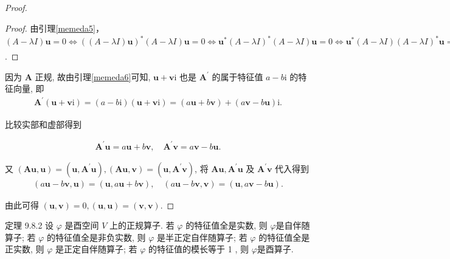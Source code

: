\begin{proof}
\begin{proof}
        由引理\cref{memeda5}，$(A-\lambda I)\boldsymbol{u}=0\Leftrightarrow ((A-\lambda I)\boldsymbol{u})^*(A-\lambda I)\boldsymbol{u}=0\Leftrightarrow \boldsymbol{u}^*(A-\lambda I)^*(A-\lambda I)\boldsymbol{u}=0\Leftrightarrow \boldsymbol{u}^*(A-\lambda I)(A-\lambda I)^*\boldsymbol{u}=0\Leftrightarrow (A^*-\overline{\lambda}I)\boldsymbol{u}=(A-\lambda I)^*\boldsymbol{u}=0$.
    \end{proof}

    因为 $\boldsymbol{A}$ 正规, 故由引理\cref{memeda6}可知, $\boldsymbol{u}+\boldsymbol{v} \mathrm{i}$ 也是 $\boldsymbol{A}^{\prime}$ 的属于特征值 $a-b \mathrm{i}$ 的特征向量, 即
    \begin{align*}
        \boldsymbol{A}^{\prime}(\boldsymbol{u}+\boldsymbol{v} \mathrm{i})=(a-b \mathrm{i})(\boldsymbol{u}+\boldsymbol{v} \mathrm{i})=(a \boldsymbol{u}+b \boldsymbol{v})+(a \boldsymbol{v}-b \boldsymbol{u}) \mathrm{i} .
    \end{align*}

    比较实部和虚部得到

    \begin{align}\label{memeda7}
        \boldsymbol{A}^{\prime} \boldsymbol{u}=a \boldsymbol{u}+b \boldsymbol{v}, \quad \boldsymbol{A}^{\prime} \boldsymbol{v}=a \boldsymbol{v}-b \boldsymbol{u} .
    \end{align}

    又 $(\boldsymbol{A} \boldsymbol{u}, \boldsymbol{u})=\left(\boldsymbol{u}, \boldsymbol{A}^{\prime} \boldsymbol{u}\right),(\boldsymbol{A} \boldsymbol{u}, \boldsymbol{v})=\left(\boldsymbol{u}, \boldsymbol{A}^{\prime} \boldsymbol{v}\right)$, 将 $\boldsymbol{A} \boldsymbol{u}, \boldsymbol{A}^{\prime} \boldsymbol{u}$ 及 $\boldsymbol{A}^{\prime} \boldsymbol{v}$ 代入得到
    \begin{align*}
        (a \boldsymbol{u}-b \boldsymbol{v}, \boldsymbol{u})=(\boldsymbol{u}, a \boldsymbol{u}+b \boldsymbol{v}), \quad(a \boldsymbol{u}-b \boldsymbol{v}, \boldsymbol{v})=(\boldsymbol{u}, a \boldsymbol{v}-b \boldsymbol{u}) .
    \end{align*}

    由此可得 $(\boldsymbol{u}, \boldsymbol{v})=0,(\boldsymbol{u}, \boldsymbol{u})=(\boldsymbol{v}, \boldsymbol{v})$.

\end{proof}

\begin{theorem}[特征值全为实数的正规算子是自伴随算子]\label{memeda13}
    定理 9.8.2 设 $\varphi$ 是酉空间 $V$ 上的正规算子. 若 $\varphi$ 的特征值全是实数, 则 $\varphi$是自伴随算子; 若 $\varphi$ 的特征值全是非负实数, 则 $\varphi$ 是半正定自伴随算子; 若 $\varphi$ 的特征值全是正实数, 则 $\varphi$ 是正定自伴随算子; 若 $\varphi$ 的特征值的模长等于 1 , 则 $\varphi$是酉算子.
\end{theorem}

